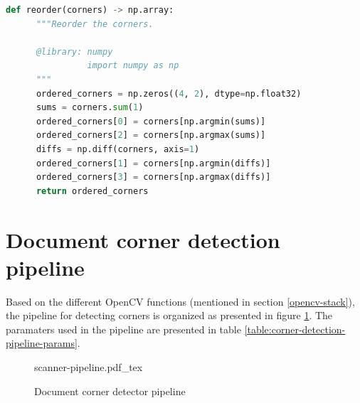 \documentclass{scrartcl}
\newcommand{\fig}[3][100]{
  \def\svgwidth{#1mm}
  {#3.pdf_tex}
}
\begin{document}
  \begin{lstlisting}[language=Python, caption={Re-order detected corners}, label={corner-reorder}]
    def reorder(corners) -> np.array:
      """Reorder the corners.

      @library: numpy
                import numpy as np
      """
      ordered_corners = np.zeros((4, 2), dtype=np.float32)
      sums = corners.sum(1)
      ordered_corners[0] = corners[np.argmin(sums)]
      ordered_corners[2] = corners[np.argmax(sums)]
      diffs = np.diff(corners, axis=1)
      ordered_corners[1] = corners[np.argmin(diffs)]
      ordered_corners[3] = corners[np.argmax(diffs)]
      return ordered_corners
  \end{lstlisting}

  \section{Document corner detection pipeline}
  \label{ss:corner-detection}

  Based on the different OpenCV functions (mentioned in section \ref{opencv-stack}), the pipeline for
  detecting corners is organized as presented in figure
  \ref{figure:scanner-corner-detector-pipeline-overview}. The paramaters used in the pipeline are
  presented in table \ref{table:corner-detection-pipeline-params}.

  \begin{figure}[htbp]
    \centering
    \fig{pictures/pipeline}{scanner-pipeline}
    \caption{Document corner detector pipeline}
    \label{figure:scanner-corner-detector-pipeline-overview}
  \end{figure}
\end{document}
